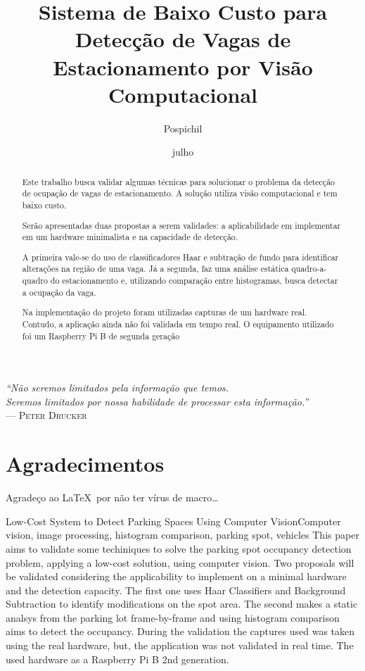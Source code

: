 \documentclass[ecp,tc]{iiufrgs}
\title{Sistema de Baixo Custo para Detecção de Vagas de Estacionamento por Visão Computacional}
\author{Pospichil}{Bruno Meybom}
\date{julho}{2015}
\begin{document}
\maketitle

\clearpage
\begin{flushright}
\mbox{}\vfill
{\sffamily\itshape
``Não seremos limitados pela informação que temos.\\
Seremos limitados por nossa habilidade de processar esta informação.''\\}
--- \textsc{Peter Drucker}
\end{flushright}

\chapter*{Agradecimentos}
Agradeço ao \LaTeX\ por não ter vírus de macro\ldots

\begin{abstract}
Este trabalho busca validar algumas técnicas para solucionar o problema da detecção de ocupação de vagas de estacionamento. A solução utiliza visão computacional e tem baixo custo.

Serão apresentadas duas propostas a serem validades: a aplicabilidade em implementar em um  hardware minimalista e na capacidade de detecção. 

A primeira vale-se do uso de classificadores Haar e subtração de fundo para identificar alterações na região de uma vaga. Já a segunda, faz uma análise estática quadro-a-quadro do estacionamento e, utilizando comparação entre histogramas, busca detectar a ocupação da vaga. 

Na implementação do projeto foram utilizadas capturas de um hardware real. Contudo, a aplicação ainda não foi validada em tempo real. O equipamento utilizado foi um Raspberry Pi B de segunda geração
\end{abstract}

\begin{englishabstract}{Low-Cost System to Detect Parking Spaces Using Computer Vision}{Computer vision, image processing, histogram comparison, parking spot, vehicles}
This paper aims to validate some techiniques to solve the parking spot occupancy detection problem, applying a low-cost solution, using computer vision. Two proposals will be validated considering the applicability to implement on a minimal hardware and the detection capacity. The first one uses Haar Classifiers and Background Subtraction to identify modifications on the spot area. The second makes a static analsys from the parking lot frame-by-frame and using histogram comparison aims to detect the occupancy. During the validation the captures used was taken using the real hardware, but, the application was not validated in real time. The used hardware as a Raspberry Pi B 2nd generation.
\end{englishabstract}
\end{document}
